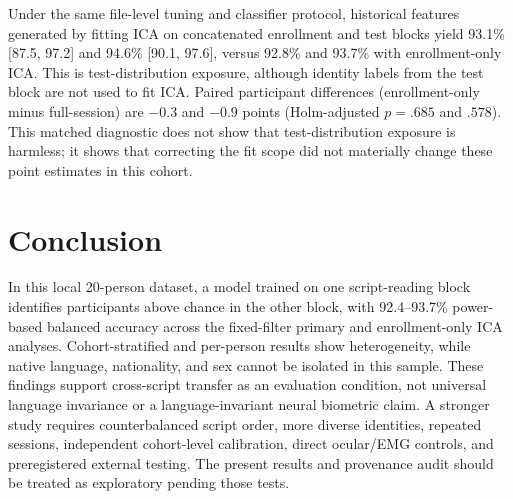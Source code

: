 \documentclass[conference]{IEEEtran}
\begin{document}
Under the same file-level tuning and classifier protocol, historical features generated by fitting ICA on concatenated enrollment and test blocks yield 93.1\% [87.5, 97.2] and 94.6\% [90.1, 97.6], versus 92.8\% and 93.7\% with enrollment-only ICA. This is test-distribution exposure, although identity labels from the test block are not used to fit ICA. Paired participant differences (enrollment-only minus full-session) are $-0.3$ and $-0.9$ points (Holm-adjusted $p=.685$ and $.578$). This matched diagnostic does not show that test-distribution exposure is harmless; it shows that correcting the fit scope did not materially change these point estimates in this cohort.

\section{Conclusion}
In this local 20-person dataset, a model trained on one script-reading block identifies participants above chance in the other block, with 92.4--93.7\% power-based balanced accuracy across the fixed-filter primary and enrollment-only ICA analyses. Cohort-stratified and per-person results show heterogeneity, while native language, nationality, and sex cannot be isolated in this sample. These findings support cross-script transfer as an evaluation condition, not universal language invariance or a language-invariant neural biometric claim. A stronger study requires counterbalanced script order, more diverse identities, repeated sessions, independent cohort-level calibration, direct ocular/EMG controls, and preregistered external testing. The present results and provenance audit should be treated as exploratory pending those tests.
\end{document}
